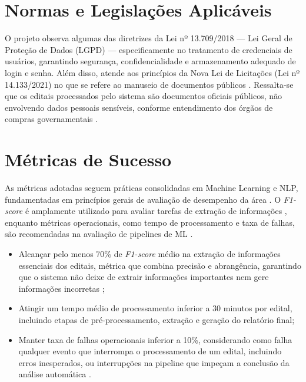\section{Normas e Legislações Aplicáveis}

O projeto observa algumas das diretrizes da Lei nº 13.709/2018 — Lei Geral de Proteção de Dados (LGPD) — especificamente no tratamento de credenciais de usuários, garantindo segurança, confidencialidade e armazenamento adequado de login e senha. Além disso, atende aos princípios da Nova Lei de Licitações (Lei nº 14.133/2021) no que se refere ao manuseio de documentos públicos \cite{brasil_lei_14133_2021}. Ressalta-se que os editais processados pelo sistema são documentos oficiais públicos, não envolvendo dados pessoais sensíveis, conforme entendimento dos órgãos de compras governamentais \cite{pncp_estatisticas_2024}.


\section{Métricas de Sucesso}

As métricas adotadas seguem práticas consolidadas em Machine Learning e NLP, fundamentadas em princípios gerais de avaliação de desempenho da área \cite{bishop2006pattern}. O \textit{F1-score} é amplamente utilizado para avaliar tarefas de extração de informações \cite{manning1999foundations}, enquanto métricas operacionais, como tempo de processamento e taxa de falhas, são recomendadas na avaliação de pipelines de ML \cite{lakshmanan2020mlpatterns}.


\begin{itemize}
    \item Alcançar pelo menos 70\% de \textit{F1-score} médio na extração de informações essenciais dos editais, métrica que combina precisão e abrangência, garantindo que o sistema não deixe de extrair informações importantes nem gere informações incorretas \cite{manning1999foundations};
    \item Atingir um tempo médio de processamento inferior a 30 minutos por edital, incluindo etapas de pré-processamento, extração e geração do relatório final;
    \item Manter taxa de falhas operacionais inferior a 10\%, considerando como falha qualquer evento que interrompa o processamento de um edital, incluindo erros inesperados, ou interrupções na pipeline que impeçam a conclusão da análise automática \cite{lakshmanan2020mlpatterns, breck2022reliableml}.
\end{itemize}
